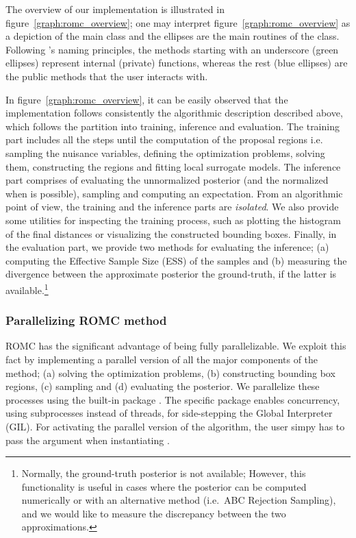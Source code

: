 The overview of our implementation is illustrated in
figure~\ref{graph:romc_overview}; one may interpret
figure~\ref{graph:romc_overview} as a depiction of the main class and
the ellipses are the main routines of the class. Following
's naming principles, the methods starting with an
underscore (green ellipses) represent internal (private) functions,
whereas the rest (blue ellipses) are the public methods that the user
interacts with.



In figure~\ref{graph:romc_overview}, it can be easily observed that the
implementation follows consistently the algorithmic description
described above, which follows the partition into training, inference
and evaluation. The training part includes all the steps until the
computation of the proposal regions i.e. sampling the nuisance
variables, defining the optimization problems, solving them,
constructing the regions and fitting local surrogate models. The
inference part comprises of evaluating the unnormalized posterior (and
the normalized when is possible), sampling and computing an
expectation. From an algorithmic point of view, the training and the
inference parts are \emph{isolated}. We also provide some utilities
for inspecting the training process, such as plotting the histogram of
the final distances or visualizing the constructed bounding
boxes. Finally, in the evaluation part, we provide two methods for
evaluating the inference; (a) computing the Effective Sample Size
(ESS) of the samples and (b) measuring the divergence between the
approximate posterior the ground-truth, if the latter is
available.\footnote{Normally, the ground-truth posterior is not
  available; However, this functionality is useful in cases where the
  posterior can be computed numerically or with an alternative method
  (i.e.\ ABC Rejection Sampling), and we would like to measure the
  discrepancy between the two approximations.}

\subsubsection*{Parallelizing ROMC method}

ROMC has the significant advantage of being fully parallelizable. We
exploit this fact by implementing a parallel version of all the major
components of the method; (a) solving the optimization problems, (b)
constructing bounding box regions, (c) sampling and (d) evaluating the
posterior. We parallelize these processes using the built-in
 package . The specific package
enables concurrency, using subprocesses instead of threads, for
side-stepping the Global Interpreter (GIL). For activating the
parallel version of the algorithm, the user simpy has to pass the
argument  when instantiating .

